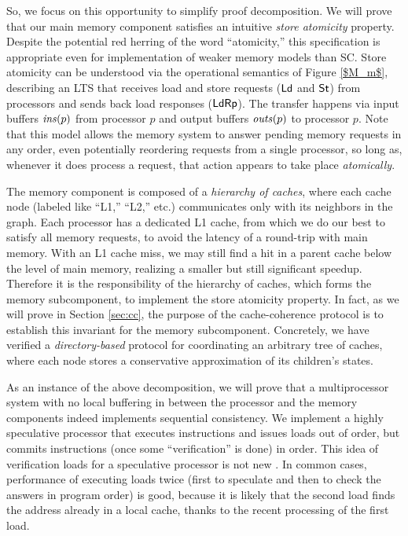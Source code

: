 So, we focus on this opportunity to simplify proof decomposition.  We will
prove that our main memory component satisfies an intuitive \emph{store
atomicity} property.  Despite the potential red herring of the word
``atomicity,'' this specification is appropriate even for implementation of
weaker memory models than SC.  Store atomicity can be understood via the
operational semantics of Figure \ref{$M_m$}, describing an LTS that receives
load and store requests ($\mathsf{Ld}$ and $\mathsf{St}$) from processors and sends back load
responses ($\mathsf{Ld}\mathsf{Rp}$). The transfer happens via input buffers $\mathit{ins}(p)$ from
processor $p$ and output buffers $\mathit{outs}(p)$ to processor $p$.  Note that this
model allows the memory system to answer pending memory requests in any order,
even potentially reordering requests from a single processor,
so long as, whenever it does process a request, that action appears to take
place \emph{atomically}.

The memory component is composed of a \emph{hierarchy of caches}, where each
cache node (labeled like ``L1,'' ``L2,'' etc.) communicates only with its
neighbors in the graph.  Each processor has a dedicated L1 cache, from which we
do our best to satisfy all memory requests, to avoid the latency of a
round-trip with main memory.  With an L1 cache miss, we may still find a hit in
a parent cache below the level of main memory, realizing a smaller but still
significant speedup.  Therefore it is the responsibility of the hierarchy of
caches, which forms the memory subcomponent, to implement the store atomicity
property. In fact, as we will prove in Section \ref{sec:cc}, the purpose of the
cache-coherence protocol is to establish this invariant for the memory
subcomponent.  Concretely, we have verified a \emph{directory-based} protocol
for coordinating an arbitrary tree of caches, where each node stores a
conservative approximation of its children's states.

As an instance of the above decomposition, we will prove that a multiprocessor
system with no local buffering in between the processor and the memory
components indeed implements sequential consistency. We implement a highly
speculative processor that executes instructions and issues loads out of order,
but commits instructions (once some ``verification'' is done) in order. This idea
of verification loads for a speculative processor is not new \cite{cain}.  In
common cases, performance of executing loads twice (first to speculate and then
to check the answers in program order) is good, because it is likely that the
second load finds the address already in a local cache, thanks to the recent
processing of the first load.

